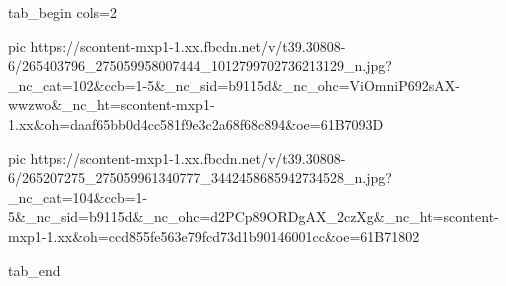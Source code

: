  
 
 
 
 


\ifcmt
  tab_begin cols=2

     pic https://scontent-mxp1-1.xx.fbcdn.net/v/t39.30808-6/265403796_275059958007444_1012799702736213129_n.jpg?_nc_cat=102&ccb=1-5&_nc_sid=b9115d&_nc_ohc=ViOmniP692sAX-wwzwo&_nc_ht=scontent-mxp1-1.xx&oh=daaf65bb0d4cc581f9e3c2a68f68c894&oe=61B7093D

     pic https://scontent-mxp1-1.xx.fbcdn.net/v/t39.30808-6/265207275_275059961340777_3442458685942734528_n.jpg?_nc_cat=104&ccb=1-5&_nc_sid=b9115d&_nc_ohc=d2PCp89ORDgAX_2czXg&_nc_ht=scontent-mxp1-1.xx&oh=ccd855fe563e79fcd73d1b90146001cc&oe=61B71802

  tab_end
\fi
